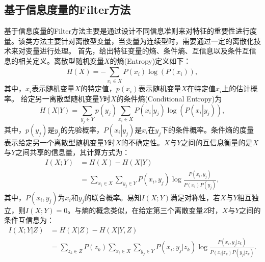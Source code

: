 \documentclass[lang=cn,10pt]{gorgeousnbook}
\numberwithin{equation}{section}%
\numberwithin{figure}{section}%
\begin{document}
\subsection{基于信息度量的Filter方法}
基于信息度量的Filter方法主要是通过设计不同信息准则来对特征的重要性进行度量。该类方法主要针对离散型变量，当变量为连续型时，需要通过一定的离散化技术来对变量进行处理。
首先，给出特征变量的熵、条件熵、互信息以及条件互信息的相关定义。离散型随机变量$X$的熵(Entropy)定义如下：
\begin{equation}
H\left( X \right) =-\sum_{x_i\in X}^{}{P\left( x_i \right) \log \left( P\left( x_i \right) \right)},
\end{equation}
其中，$x_i$表示随机变量$X$的特定值，$p\left(x_i\right)$表示随机变量$X$在特定值$x_i$上的估计概率。 给定另一离散型随机变量$Y$时$X$的条件熵(Conditional Entropy)为
\begin{equation}
H\left( X\left| Y \right. \right) =\sum_{y_j\in Y}{p\left( y_j \right)}\sum_{x_i\in X}^{}{P\left( x_i\left| y_j \right. \right) \log \left( P\left( x_i\left| y_j \right. \right) \right)},
\end{equation}
其中，$p\left( y_j \right)$是$y_j$的先验概率，$P\left( x_i\left| y_j \right. \right)$是$x_i$在$y_j$下的条件概率。条件熵的度量表示给定另一个离散型随机变量$Y$时$X$的不确定性。$X$与$Y$之间的互信息衡量的是$X$与$Y$之间共享的信息量，其计算方式为：
\begin{equation}
\begin{aligned}
I\left( X;Y \right)& =H\left( X \right) -H\left( X\left| Y \right. \right) \\
&=\sum_{x_i\in X}{\sum_{y_j\in Y}{P\left( x_i,y_j \right) \log \frac{P\left( x_i,y_j \right)}{P\left( x_i \right) P\left( y_j \right)},}}
\end{aligned}
\end{equation}
其中，$P\left( x_i,y_j \right)$为$x_i$和$y_j$的联合概率。易知$I\left( X;Y \right)$满足对称性，若$X$与$Y$相互独立，则$I\left( X;Y \right)=0$。与熵的概念类似，在给定第三个离散变量$Z$时，$X$与$Y$之间的条件互信息为：
\begin{equation}
\begin{aligned}
I\left( X;Y\left| Z \right. \right)&=H\left( X\left| Z \right. \right) -H\left( X\left| Y,Z \right. \right) \\
&=\sum_{z_k\in Z}{P\left( z_k \right)}\sum_{x_i\in X}{\sum_{y_j\in Y}{P\left( x_i,y_j\left| z_k \right. \right) \log \frac{P\left( x_i,y_j\left| z_k \right. \right)}{P\left( x_i\left| z_k \right. \right) P\left( y_j\left| z_k \right. \right)}.}}
\end{aligned}
\end{equation}
\end{document}
